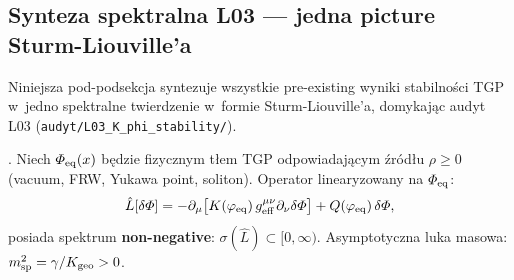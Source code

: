 
\subsection{Synteza spektralna L03 --- jedna picture Sturm-Liouville'a}%
\label{ssec:spectral-synthesis-L03}


Niniejsza pod-podsekcja syntezuje wszystkie pre-existing wyniki
stabilno\'sci TGP w~jedno spektralne twierdzenie w~formie
Sturm-Liouville'a, domykaj\k{a}c audyt L03
(\texttt{audyt/L03\_K\_phi\_stability/}).

\begin{theorem}%
\label{thm:spectral-synthesis-L03}
.
Niech $\Phi_{\rm eq}(x)$ b\k{e}dzie fizycznym t\l{}em TGP odpowiadaj\k{a}cym
\'zr\'od\l{}u $\rho \geq 0$ (vacuum, FRW, Yukawa point, soliton).
Operator linearyzowany na $\Phi_{\rm eq}$:
\begin{equation}\label{eq:L-operator-spectral}
  \hat{L}[\delta\Phi]
    = -\partial_\mu\bigl[K(\varphi_{\rm eq})\,
      g_{\rm eff}^{\mu\nu}\partial_\nu\delta\Phi\bigr]
    + Q(\varphi_{\rm eq})\,\delta\Phi,
\end{equation}
posiada spektrum \textbf{non-negative}: $\sigma(\hat{L}) \subset [0,\infty)$.
Asymptotyczna luka masowa: $m_{\rm sp}^2 = \gamma/K_{\rm geo} > 0$.
\end{theorem}

